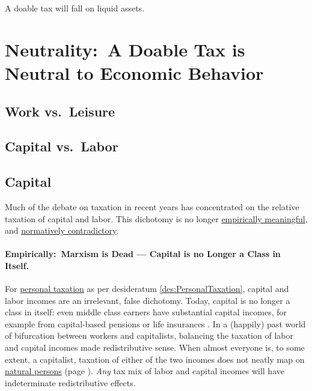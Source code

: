 \begin{desideratum}
	A doable tax will fall on liquid assets.
	\label{des:NoIlliquidAssets}
\end{desideratum}

\section[Neutrality]{Neutrality:~A Doable Tax is Neutral to Economic Behavior} \label{sec:tax-neutrality}

\subsection{Work vs.\ Leisure}



\subsection{Capital vs.\ Labor} %

\subsection{Capital}
Much of the debate on taxation in recent years has concentrated on the relative taxation of capital and labor.
This dichotomy is no longer \href{sec:CapitalNoClass}{empirically meaningful}, and \href{sec:TwoSavingsNorms}{normatively contradictory}.

\paragraph{Empirically:~Marxism is Dead --- Capital is no Longer a Class in Itself.}  \label{sec:CapitalNoClass} For \href{des:PersonalTaxation}{personal taxation} as per desideratum \ref{des:PersonalTaxation}, capital and labor incomes are an irrelevant, false dichotomy.
Today, capital is no longer a class in itself:
even middle class earners have substantial capital incomes, for example from capital-based pensions or life insurances \citep[XV]{Grabka2007a}.
In a (happily) past world of bifurcation between workers and capitalists, balancing the taxation of labor and capital incomes made redistributive sense.
When almost everyone is, to some extent, a capitalist, taxation of either of the two incomes does not neatly map on \hyperref[des:PersonalTaxation]{natural persons} (page \pageref{des:PersonalTaxation}).
\emph{Any} tax mix of labor and capital incomes will have indeterminate redistributive effects.

